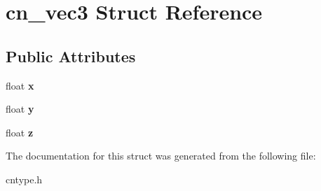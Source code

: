 \hypertarget{structcn__vec3}{\section{cn\-\_\-vec3 Struct Reference}
\label{structcn__vec3}
}
\subsection*{Public Attributes}
\begin{DoxyCompactItemize}
\item 
\hypertarget{structcn__vec3_aaead29da873346775f81c3cc9ec46657}{float {\bfseries x}}\label{structcn__vec3_aaead29da873346775f81c3cc9ec46657}

\item 
\hypertarget{structcn__vec3_a6faa1400ed8b31756f8013fdb35c238c}{float {\bfseries y}}\label{structcn__vec3_a6faa1400ed8b31756f8013fdb35c238c}

\item 
\hypertarget{structcn__vec3_ae4d91cc173348fb83029575db29180f9}{float {\bfseries z}}\label{structcn__vec3_ae4d91cc173348fb83029575db29180f9}

\end{DoxyCompactItemize}


The documentation for this struct was generated from the following file\-:\begin{DoxyCompactItemize}
\item 
cntype.\-h\end{DoxyCompactItemize}
